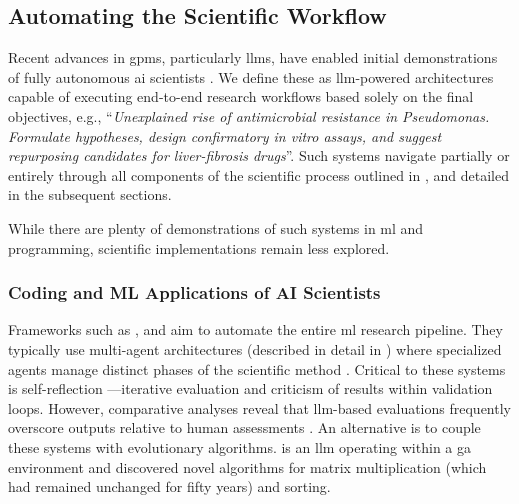 \subsection{Automating the Scientific Workflow} \label{sec:ai-scientists}

Recent advances in \glspl{gpm}, particularly \glspl{llm}, have enabled initial demonstrations of fully autonomous \gls{ai} scientists \autocite{schmidgall2025agent}. 
We define these as \gls{llm}-powered architectures capable of executing end-to-end research workflows based solely on the final objectives, e.g., \enquote{\textit{Unexplained rise of antimicrobial resistance in Pseudomonas. Formulate hypotheses, design confirmatory in vitro assays, and suggest repurposing candidates for liver-fibrosis drugs}}. 
Such systems navigate partially or entirely through all components of the scientific process outlined in , and detailed in the subsequent sections. 

While there are plenty of demonstrations of such systems in \gls{ml} and programming, scientific implementations remain less explored.

\subsubsection{Coding and ML Applications of AI Scientists}

Frameworks such as  \autocite{gottweis2025towards}, and  \autocite{yamada2025ai} aim to automate the entire \gls{ml} research pipeline. They typically use multi-agent architectures (described in detail in ) where specialized agents manage distinct phases of the scientific method \autocite{schmidgall2025agentrxiv}. 
Critical to these systems is self-reflection \autocite{renze2024self0reflection}---iterative evaluation and criticism of results within validation loops. 
However, comparative analyses reveal that \gls{llm}-based evaluations frequently overscore outputs relative to human assessments \autocite{huang2023mlagentbench0, chan2024mle, starace2025paperbench0}. 
An alternative is to couple these systems with evolutionary algorithms.   \autocite{novikov2025alphaevolve} is an \gls{llm} operating within a \gls{ga} environment and discovered novel algorithms for matrix multiplication (which had remained unchanged for fifty years) and sorting.


